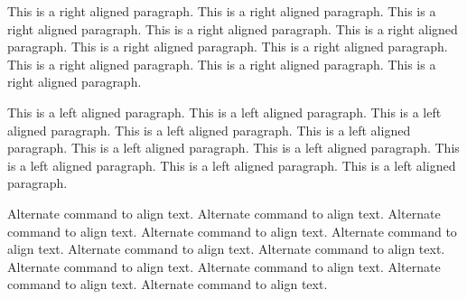 \documentclass[12pt,twoside,a4paper]{article}
\begin{document}
\begin{flushright}
This is a right aligned paragraph. This is a right aligned paragraph. This is a right aligned paragraph. This is a right aligned paragraph. This is a right aligned paragraph. This is a right aligned paragraph. This is a right aligned paragraph. This is a right aligned paragraph. This is a right aligned paragraph. This is a right aligned paragraph.
\end{flushright}

\begin{flushleft}
This is a left aligned paragraph. This is a left aligned paragraph. This is a left aligned paragraph. This is a left aligned paragraph. This is a left aligned paragraph. This is a left aligned paragraph. This is a left aligned paragraph. This is a left aligned paragraph. This is a left aligned paragraph. This is a left aligned paragraph.
\end{flushleft}

\centering
Alternate command to align text. Alternate command to align text. Alternate command to align text. Alternate command to align text. Alternate command to align text. \justify Alternate command to align text. Alternate command to align text. Alternate command to align text. Alternate command to align text. Alternate command to align text. Alternate command to align text.
\end{document}
